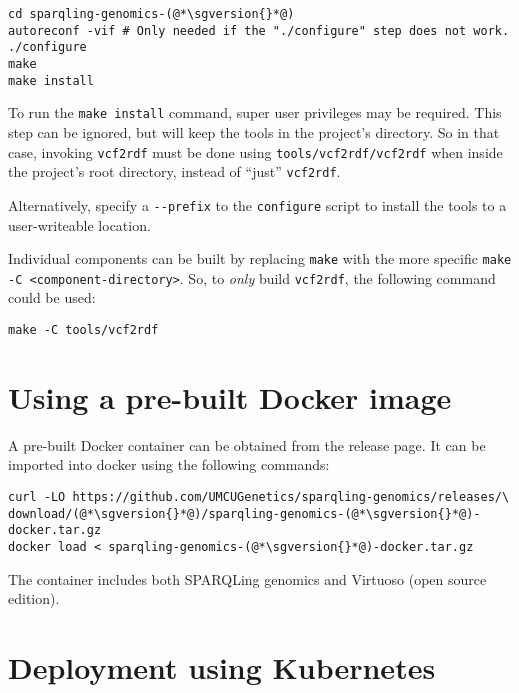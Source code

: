 \begin{siderules}
\begin{lstlisting}
cd sparqling-genomics-(@*\sgversion{}*@)
autoreconf -vif # Only needed if the "./configure" step does not work.
./configure
make
make install
\end{lstlisting}
\end{siderules}

  To run the \texttt{make install} command, super user privileges may be
  required.  This step can be ignored, but will keep the tools in the project's
  directory.  So in that case, invoking \texttt{vcf2rdf} must be done using
  \texttt{tools/vcf2rdf/vcf2rdf} when inside the project's root directory,
  instead of ``just'' \texttt{vcf2rdf}.

  Alternatively, specify a \texttt{-{}-prefix} to the \texttt{configure}
  script to install the tools to a user-writeable location.

  Individual components can be built by replacing \texttt{make} with the
  more specific \texttt{make -C <component-directory>}.  So, to \emph{only}
  build \texttt{vcf2rdf}, the following command could be used:

\begin{siderules}
\begin{verbatim}
make -C tools/vcf2rdf
\end{verbatim}
\end{siderules}

\section{Using a pre-built Docker image}

  A pre-built Docker container can be obtained from the release page.  It
  can be imported into docker using the following commands:

\begin{siderules}
\begin{lstlisting}
curl -LO https://github.com/UMCUGenetics/sparqling-genomics/releases/\
download/(@*\sgversion{}*@)/sparqling-genomics-(@*\sgversion{}*@)-docker.tar.gz
docker load < sparqling-genomics-(@*\sgversion{}*@)-docker.tar.gz
\end{lstlisting}
\end{siderules}

  The container includes both SPARQLing genomics and Virtuoso (open source
  edition).

\section{Deployment using Kubernetes}

